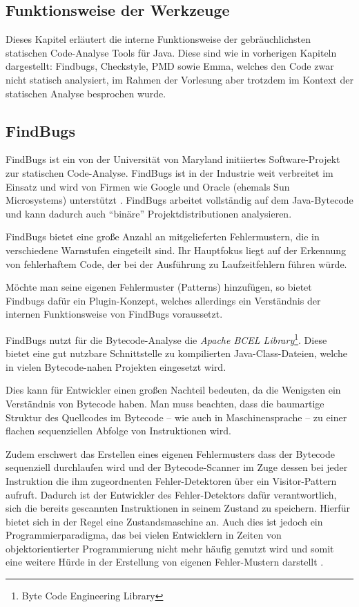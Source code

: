 \begin{flushleft}
\section{Funktionsweise der Werkzeuge}
\end{flushleft}
Dieses Kapitel erläutert die interne Funktionsweise der gebräuchlichsten statischen Code-Analyse Tools für Java. Diese sind wie in vorherigen Kapiteln dargestellt: Findbugs, Checkstyle, PMD sowie Emma, welches den Code zwar nicht statisch analysiert, im Rahmen der Vorlesung aber trotzdem im Kontext der statischen Analyse besprochen wurde.\\


\subsection{FindBugs}

FindBugs ist ein von der Universität von Maryland initiiertes Software-Projekt zur statischen Code-Analyse. FindBugs ist in der Industrie weit verbreitet im Einsatz und wird von Firmen wie Google und Oracle (ehemals Sun Microsystems) unterstützt \citep{findbugsUser}.
FindBugs arbeitet vollständig auf dem Java-Bytecode und kann dadurch auch ``binäre'' Projektdistributionen analysieren. 

FindBugs bietet eine große Anzahl an mitgelieferten Fehlermustern, die in verschiedene Warnstufen eingeteilt sind. Ihr Hauptfokus liegt auf der Erkennung von fehlerhaftem Code, der bei der Ausführung zu Laufzeitfehlern führen würde.

Möchte man seine eigenen Fehlermuster (Patterns) hinzufügen, so bietet Findbugs dafür ein Plugin-Konzept, welches allerdings ein Verständnis der internen Funktionsweise von FindBugs voraussetzt.
 
FindBugs nutzt für die Bytecode-Analyse die \textit{Apache BCEL Library}\footnote{Byte Code Engineering Library}. Diese bietet eine gut nutzbare Schnittstelle zu kompilierten Java-Class-Dateien, welche in vielen Bytecode-nahen Projekten eingesetzt wird. %

Dies kann für Entwickler einen großen Nachteil bedeuten, da die Wenigsten ein Verständnis von Bytecode haben. Man muss beachten, dass die baumartige Struktur des Quellcodes im Bytecode -- wie auch in Maschinensprache -- zu einer flachen sequenziellen Abfolge von Instruktionen wird. 

Zudem erschwert das Erstellen eines eigenen Fehlermusters dass der Bytecode sequenziell durchlaufen wird und der Bytecode-Scanner im Zuge dessen bei jeder Instruktion die ihm zugeordnenten Fehler-Detektoren über ein Visitor-Pattern aufruft. 
Dadurch ist der Entwickler des Fehler-Detektors dafür verantwortlich, sich die bereits gescannten Instruktionen in seinem Zustand zu speichern. Hierfür bietet sich in der Regel eine Zustandsmaschine an. Auch dies ist jedoch ein Programmierparadigma, das bei vielen Entwicklern in Zeiten von objektorientierter Programmierung nicht mehr häufig genutzt wird und somit eine weitere Hürde in der Erstellung von eigenen Fehler-Mustern darstellt \citep{findbugsDetector}.

